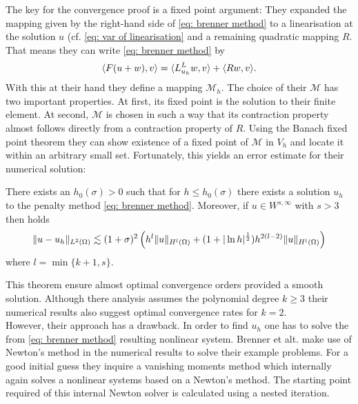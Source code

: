 The key for the convergence proof is a fixed point argument: They expanded the mapping given by the right-hand side of \eqref{eq: brenner method} to a linearisation at the solution $u$ (cf. \eqref{eq: var of linearisation}  and a remaining quadratic mapping $R$. That means they can write \eqref{eq: brenner method} by 
\begin{align}
	 \langle F (u+w), v \rangle =  \langle L^L_{u_h}w, v \rangle +  \langle Rw, v \rangle. \label{eq: brenner entwicklung}
\end{align}
With this at their hand they define a mapping $\mathcal M_h$. The choice of their $\mathcal M$ has two important properties. At first, its fixed point is the solution to their finite element. At second, $\mathcal M$ is chosen in such a way that its contraction property almost follows directly from a contraction property of $R$.
Using the Banach fixed point theorem they can show existence of a fixed point of $\mathcal M$ in $V_h$ and locate it within an arbitrary small set. Fortunately, this yields an error estimate for their numerical solution:
\begin{theorem}\label{thm: error estimate brenner}
	There exists an $h_0(\sigma) > 0$ such that for $h \leq h_0(\sigma)$ there exists a solution $u_h$ to the penalty method \eqref{eq: brenner method}. Moreover, if $u \in W^{s,\infty}$ with $s>3$ then holds
	\begin{align*}
		\lVert u-u_h \rVert_{L^2(\Omega)} \lesssim (1+\sigma)^2 
		                        \left(h^{l} \lVert u \rVert_{H^l(\Omega)} + (1+ | \ln h |^{\frac 1 2 }) h^{2(l-2)} \lVert u \rVert_{H^l(\Omega)} \right)
	\end{align*}
where $l=\min\{k+1,s\}$. 
\end{theorem}
This theorem ensure almost optimal convergence orders provided a smooth solution. Although there analysis assumes the polynomial degree $k\geq 3$ their numerical results also suggest optimal convergence rates for $k=2$.\\
However, their approach has a drawback. In order to find $u_h$ one has to solve the from \eqref{eq: brenner method} resulting nonlinear system. Brenner et alt. make use of Newton's method in the numerical results to solve their example problems. For a good initial guess they inquire a vanishing moments method which internally again solves a nonlinear systems based on a Newton's method. The starting point required of this internal Newton solver is calculated using a nested iteration.

